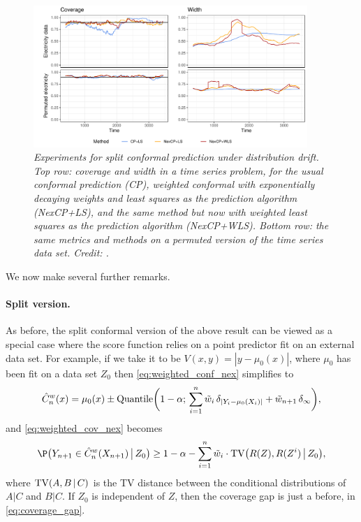 \documentclass{article}
\begin{document}
\begin{figure}[htb]
\centering
\includegraphics[width=0.925\textwidth]{electricity.pdf}
\caption{\it Experiments for split conformal prediction under distribution
  drift. Top row: coverage and width in a time series problem, for the usual
  conformal prediction (CP), weighted conformal with exponentially decaying
  weights and least squares as the prediction algorithm (NexCP+LS), and the same
  method but now with weighted least squares as the prediction algorithm 
  (NexCP+WLS). Bottom row: the same metrics and methods on a permuted version of 
  the time series data set. Credit: \citet{barber2022conformal}.}        
\label{fig:electricity}
\end{figure}

We now make several further remarks. 

\paragraph{Split version.}

As before, the split conformal version of the above result can be viewed as a
special case where the score function relies on a point predictor fit on an
external data set. For example, if we take it to be $V(x,y) = |y-\mu_0(x)|$,
where $\mu_0$ has been fit on a data set $Z_0$ then \eqref{eq:weighted_conf_nex}
simplifies to            
\[
\hat{C}^w_n(x) = \mu_0(x) \pm \mathrm{Quantile}\bigg(1-\alpha; \, \sum_{i=1}^n \tilde{w}_i \,
\delta_{|Y_i - \mu_0(X_i)|} + \tilde{w}_{n+1} \, \delta_\infty \bigg),
\]
and \eqref{eq:weighted_cov_nex} becomes
\[
\P\big( Y_{n+1} \in \hC^w_n(X_{n+1}) \,\big|\, Z_0 \big) \geq 1-\alpha -
\sum_{i=1}^n \tw_i \cdot \TV\big( R(Z), R(Z^i) \,\big|\, Z_0 \big), 
\]
where $\mathrm{TV}(A, B \,|\, C)$ is the TV distance between the conditional
distributions of $A|C$ and $B|C$. If $Z_0$ is independent of $Z$, then the
coverage gap is just a before, in \eqref{eq:coverage_gap}.
\end{document}
